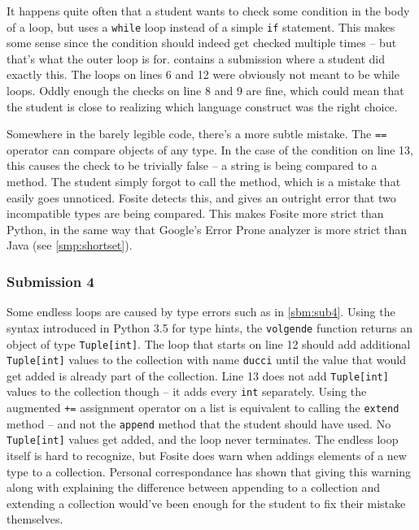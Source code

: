 \documentclass[a4paper, 16pt, oneside]{Thesis}
\begin{document}


It happens quite often that a student wants to check some condition in
the body of a loop, but uses a \texttt{while} loop instead of a simple
\texttt{if} statement. This makes some sense since the condition should
indeed get checked multiple times -- but that's what the outer loop is
for.  contains a submission where a student did exactly
this. The loops on lines 6 and 12 were obviously not meant to be while
loops. Oddly enough the checks on line 8 and 9 are fine, which could
mean that the student is close to realizing which language construct was
the right choice.

Somewhere in the barely legible code, there's a more subtle mistake. The
\texttt{==} operator can compare objects of any type. In the case of the
condition on line 13, this causes the check to be trivially false -- a
string is being compared to a method. The student simply forgot to call
the method, which is a mistake that easily goes unnoticed. Fosite
detects this, and gives an outright error that two incompatible types
are being compared. This makes Fosite more strict than Python, in the
same way that Google's Error Prone analyzer is more strict than Java
(see \cref{smp:shortset}).

\subsubsection{Submission 4}\label{submission-4}



\clearpage

Some endless loops are caused by type errors such as in \cref{sbm:sub4}.
Using the syntax introduced in Python 3.5 for type hints, the
\texttt{volgende} function returns an object of type
\texttt{Tuple{[}int{]}}. The loop that starts on line 12 should add
additional \texttt{Tuple{[}int{]}} values to the collection with name
\texttt{ducci} until the value that would get added is already part of
the collection. Line 13 does not add \texttt{Tuple{[}int{]}} values to
the collection though -- it adds every \texttt{int} separately. Using
the augmented \texttt{+=} assignment operator on a list is equivalent to
calling the \texttt{extend} method -- and not the \texttt{append} method
that the student should have used. No \texttt{Tuple{[}int{]}} values get
added, and the loop never terminates. The endless loop itself is hard to
recognize, but Fosite does warn when addings elements of a new type to a
collection. Personal correspondance has shown that giving this warning
along with explaining the difference between appending to a collection
and extending a collection would've been enough for the student to fix
their mistake themselves.
\end{document}
